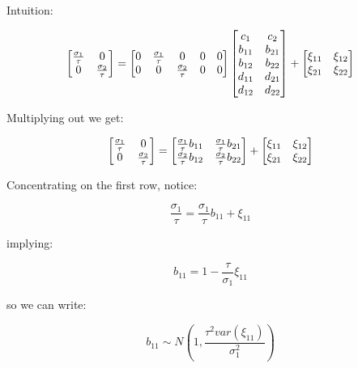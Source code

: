\documentclass[
  letterpaper,
]{book}
\begin{document}
Intuition:

\begin{equation}
  \left[\begin{matrix} \frac{\sigma_1}{\tau} & 0 \cr
    0 & \frac{\sigma_2}{\tau}\end{matrix}\right] =
  \left[\begin{matrix} 0 & \frac{\sigma_1}{\tau} & 0 & 0 & 0\cr
   0 & 0 & \frac{\sigma_2}{\tau} & 0 & 0\end{matrix} \right]
\left[\begin{matrix}c_1 & c_2 \cr
  b_{11} & b_{21} \cr
  b_{12} & b_{22} \cr
  d_{11} & d_{21} \cr
  d_{12} & d_{22}\end{matrix}\right]
+
  \left[\begin{matrix}\xi_{11} & \xi_{12} \cr \xi_{21} & \xi_{22} \end{matrix}\right]
\end{equation}

Multiplying out we get:

\begin{equation}
  \left[\begin{matrix}\frac{\sigma_1}{\tau} & 0 \cr
    0 & \frac{\sigma_2}{\tau}\end{matrix}\right]
=
  \left[\begin{matrix}\frac{\sigma_1}{\tau}b_{11} & \frac{\sigma_1}{\tau}b_{21}\cr
  \frac{\sigma_2}{\tau}b_{12} &  \frac{\sigma_2}{\tau}b_{22}\end{matrix} \right]
+
  \left[\begin{matrix}\xi_{11} & \xi_{12} \cr \xi_{21} & \xi_{22} \end{matrix}\right]
\end{equation}

Concentrating on the first row, notice:

\begin{equation}
  \frac{\sigma_1}{\tau} = \frac{\sigma_1}{\tau}b_{11} + \xi_{11}
\end{equation}

implying:

\begin{equation}
  b_{11} = 1 - \frac{\tau}{\sigma_1}\xi_{11}
\end{equation}

so we can write:

\begin{equation}
  b_{11} \sim N\left(1, \frac{\tau^2var(\xi_{11})}{\sigma^2_1}\right)
\end{equation}
\end{document}
